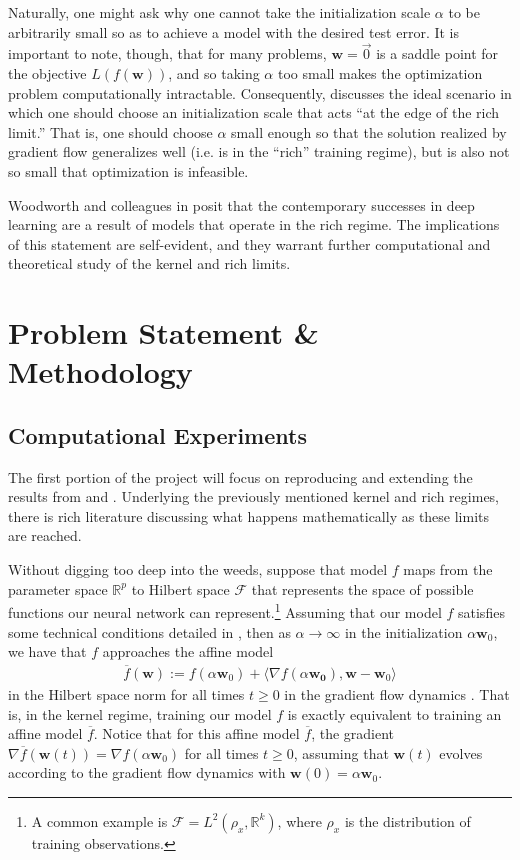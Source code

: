\documentclass{article}
\begin{document}
Naturally, one might ask why one cannot take the initialization scale $\alpha$ to be arbitrarily small so as to achieve a model with the desired test error. It is important to note, though, that for many problems, $\boldsymbol{w} = \vec{0}$ is a saddle point for the objective $L(f(\boldsymbol{w}))$, and so taking $\alpha$ too small makes the optimization problem computationally intractable. Consequently, \cite{woodworth2020kernel} discusses the ideal scenario in which one should choose an initialization scale that acts \enquote{at the edge of the rich limit.} That is, one should choose $\alpha$ small enough so that the solution realized by gradient flow generalizes well (i.e. is in the \enquote{rich} training regime), but is also not so small that optimization is infeasible. 

Woodworth and colleagues in \cite{woodworth2020kernel} posit that the contemporary successes in deep learning are a result of models that operate in the rich regime. The implications of this statement are self-evident, and they warrant further computational and theoretical study of the kernel and rich limits.

\section{Problem Statement \& Methodology}
\subsection{Computational Experiments}
The first portion of the project will focus on reproducing and extending the results from \cite{chizat2018lazy} and \cite{woodworth2020kernel}. Underlying the previously mentioned kernel and rich regimes, there is rich literature discussing what happens mathematically as these limits are reached. 

Without digging too deep into the weeds, suppose that model $f$ maps from the parameter space $\mathbb{R}^p$ to Hilbert space $\mathcal{F}$ that represents  the space of possible functions our neural network can represent.\footnote{A common example is $\mathcal{F} = L^2(\rho_x, \mathbb{R}^k)$, where $\rho_x$ is the distribution of training observations.} Assuming that our model $f$ satisfies some technical conditions detailed in \cite{chizat2018lazy}, then as $\alpha \rightarrow \infty$ in the initialization $\alpha \boldsymbol{w}_0$, we have that $f$ approaches the affine model 
\begin{align}\label{linearizedmodel}
    \overline{f}(\boldsymbol{w}) := f(\alpha \boldsymbol{w}_0) + \langle \nabla f(\alpha\boldsymbol{w_0}), \boldsymbol{w} - \boldsymbol{w}_0 \rangle
\end{align}
in the Hilbert space norm for all times $t \geq 0$ in the gradient flow dynamics \cite{chizat2018lazy}. That is, in the kernel regime, training our model $f$ is exactly equivalent to training an affine model $\overline{f}$. Notice that for this affine model $\overline{f}$, the gradient $\nabla \overline{f}(\boldsymbol{w}(t)) = \nabla f(\alpha \boldsymbol{w}_0)$ for all times $t \geq 0$, assuming that $\boldsymbol{w}(t)$ evolves according to the gradient flow dynamics with $\boldsymbol{w}(0) = \alpha \boldsymbol{w}_0$.
\end{document}
